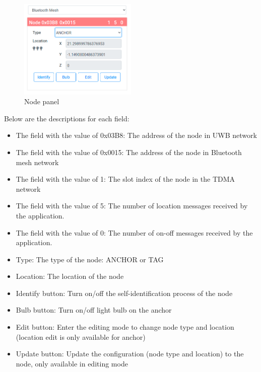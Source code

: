 \documentclass[\main/main.tex]{subfiles}
\begin{document}
\begin{figure}[H]   
    \centering
    \includegraphics[width=0.5\textwidth]{control_and_manage_pannel.png}
    \caption{Node panel}
    \label{fig:control_and_manage_pannel}
\end{figure}

Below are the descriptions for each field:
\begin{itemize}
    \item The field with the value of 0x03B8: The address of the node in UWB network
    \item The field with the value of 0x0015: The address of the node in Bluetooth mesh network
    \item The field with the value of 1: The slot index of the node in the TDMA network
    \item The field with the value of 5: The number of location messages received by the application.
    \item The field with the value of 0: The number of on-off messages received by the application.
    \item Type: The type of the node: ANCHOR or TAG
    \item Location: The location of the node
    \item Identify button: Turn on/off the self-identification process of the node
    \item Bulb button: Turn on/off light bulb on the anchor
    \item Edit button: Enter the editing mode to change node type and location (location edit is only available for anchor)
    \item Update button: Update the configuration (node type and location) to the node, only available in editing mode
\end{itemize}

\bib
\end{document}

